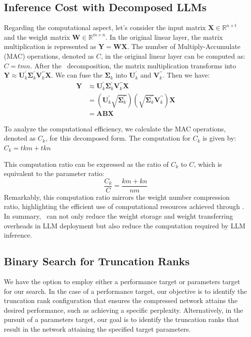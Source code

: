 \subsection{Inference Cost with Decomposed LLMs}
Regarding the computational aspect, let's consider the input matrix $\mathbf{X} \in \mathbb{R}^{n \times t}$ and the weight matrix $\mathbf{W} \in \mathbb{R}^{m \times n}$. In the original linear layer, the matrix multiplication is represented as $\mathbf{Y} = \mathbf{W}\mathbf{X}$. The number of Multiply-Accumulate (MAC) operations, denoted as $C$, in the original linear layer can be computed as: $C = tmn$.
After the \asvd~decomposition, the matrix multiplication transforms into $\mathbf{Y} \approx \mathbf{U}_k^{\prime} \mathbf{\Sigma}_k^{\prime} \mathbf{V}_k^{\prime\prime} \mathbf{X} $. We can fuse the $\mathbf{\Sigma}_k$ into $\mathbf{U}_k^{\prime}$ and $\mathbf{V}_k^{\prime\prime}$. Then we have:
\begin{align}
    \mathbf{Y} & \approx \mathbf{U}_k^{\prime} \mathbf{\Sigma}_k^{\prime} \mathbf{V}_k^{\prime\prime} \mathbf{X} \\
    & = (\mathbf{U}_k^{\prime} \sqrt{\mathbf{\Sigma}_k^{\prime}} )(\sqrt{\mathbf{\Sigma}_k^{\prime}}\mathbf{V}_k^{\prime\prime}) \mathbf{X} \\
    & = \mathbf{A}\mathbf{B} \mathbf{X}
\end{align}
    
To analyze the computational efficiency, we calculate the MAC operations, denoted as $C_k$, for this decomposed form. The computation for $C_k$ is given by:
$C_k = tkm+tkn$

This computation ratio can be expressed as the ratio of $C_k$ to $C$, which is equivalent to the parameter ratio:
\begin{equation}
    \frac{C_k}{C} = \frac{km + kn}{nm}
\end{equation}
Remarkably, this computation ratio mirrors the weight number compression ratio, highlighting the efficient use of computational resources achieved through \asvd. 
In summary, \asvd~can not only reduce the weight storage and weight transferring overheads in LLM deployment but also reduce the computation required by LLM inference. 


\subsection{Binary Search for Truncation Ranks}

We have the option to employ either a performance target or parameters target for our search. 
In the case of a performance target, our objective is to identify the truncation rank configuration that ensures the compressed network attains the desired performance, such as achieving a specific perplexity. 
Alternatively, in the pursuit of a parameters target, our goal is to identify the truncation ranks that result in the network attaining the specified target parameters.

